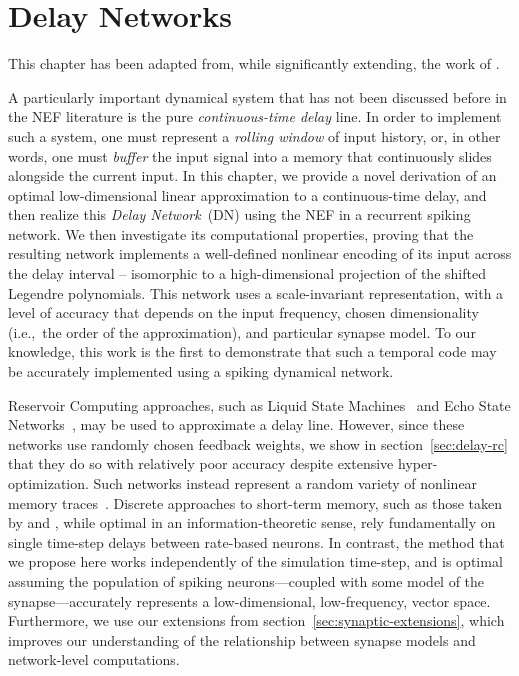 \chapter{Delay Networks}
\label{chapt:delays}

This chapter has been adapted from, while significantly extending, the work of \citet[][patent pending]{voelker2015computing, dynamicspatent, voelker2018, thesispatent}.

A particularly important dynamical system that has not been discussed before in the NEF literature is the pure \emph{continuous-time delay} line.
In order to implement such a system, one must represent a \emph{rolling window} of input history, or, in other words, one must \emph{buffer} the input signal into a memory that continuously slides alongside the current input.
In this chapter, we provide a novel derivation of an optimal low-dimensional linear approximation to a continuous-time delay, and then realize this \emph{Delay Network}~(DN) using the NEF in a recurrent spiking network.
We then investigate its computational properties, proving that the resulting network implements a well-defined nonlinear encoding of its input across the delay interval -- isomorphic to a high-dimensional projection of the shifted Legendre polynomials.
This network uses a scale-invariant representation, with a level of accuracy that depends on the input frequency, chosen dimensionality (i.e.,~the order of the approximation), and particular synapse model.
To our knowledge, this work is the first to demonstrate that such a temporal code may be accurately implemented using a spiking dynamical network.

Reservoir Computing approaches, such as Liquid State Machines~\citep{maass2002real} and Echo State Networks~\citep{jaeger2001echo}, may be used to approximate a delay line.
However, since these networks use randomly chosen feedback weights, we show in section~\ref{sec:delay-rc} that they do so with relatively poor accuracy despite extensive hyper-optimization.
Such networks instead represent a random variety of nonlinear memory traces~\citep{lukovsevicius2012reservoir}.
Discrete approaches to short-term memory, such as those taken by \citet{white2004short} and \citet{ganguli2008memory}, while optimal in an information-theoretic sense, rely fundamentally on single time-step delays between rate-based neurons.
In contrast, the method that we propose here works independently of the simulation time-step, and is optimal assuming the population of spiking neurons---coupled with some model of the synapse---accurately represents a low-dimensional, low-frequency, vector space.
Furthermore, we use our extensions from section~\ref{sec:synaptic-extensions}, which improves our understanding of the relationship between synapse models and network-level computations.

